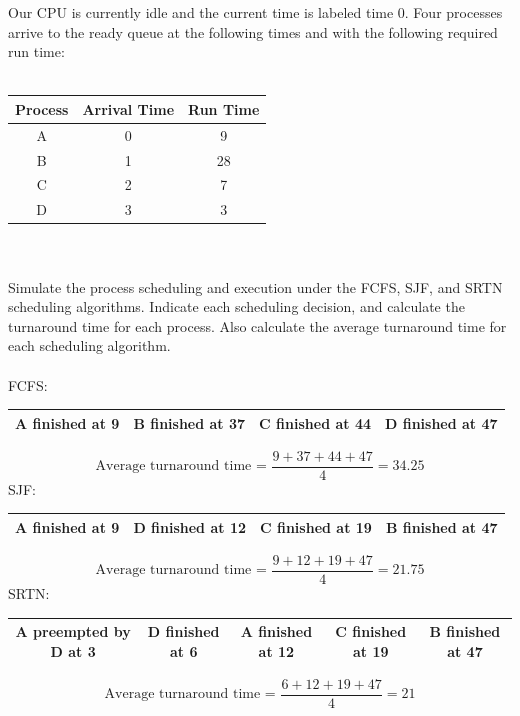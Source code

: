 \documentclass[12pt]{article}
\newenvironment{problem}[2][Problem]{\begin{trivlist}
\item[\hskip \labelsep {\bfseries #1}\hskip \labelsep {\bfseries #2.}]}{\end{trivlist}}
\begin{document}
\pagebreak
\begin{problem}{4}
Our CPU is currently idle and the current time is labeled time 0. Four
processes arrive to the ready queue at the following times and with the following required
run time:\\\\
\begin{tabular}{|c|c|c|} 
    \hline
    Process & Arrival Time & Run Time\\
    \hline
    A & 0 & 9\\
    B & 1 & 28\\
    C & 2 & 7\\
    D & 3 & 3\\
    \hline
\end{tabular}
\\\\Simulate the process scheduling and execution under the FCFS, SJF, and SRTN scheduling
algorithms. Indicate each scheduling decision, and calculate the turnaround time for each
process. Also calculate the average turnaround time for each scheduling algorithm.\\\\
FCFS:\\
\begin{tabular}{|c|c|c|c|} 
    \hline
    A finished at 9 & B finished at 37 & C finished at 44 & D finished at 47 \\
    \hline
\end{tabular}
$$\text{Average turnaround time = }\frac{9+37+44+47}{4} = 34.25$$
SJF:\\
\begin{tabular}{|c|c|c|c|} 
    \hline
    A finished at 9 & D finished at 12 & C finished at 19 & B finished at 47 \\
    \hline
\end{tabular}
$$\text{Average turnaround time = }\frac{9+12+19+47}{4} = 21.75$$
SRTN:\\
\begin{tabular}{|c|c|c|c|c|} 
    \hline
    A preempted by D at 3& D finished at 6 & A finished at 12& C finished at 19 & B finished at 47 \\
    \hline
\end{tabular}
$$\text{Average turnaround time = }\frac{6+12+19+47}{4} = 21$$
\end{problem}
\pagebreak
\end{document}
